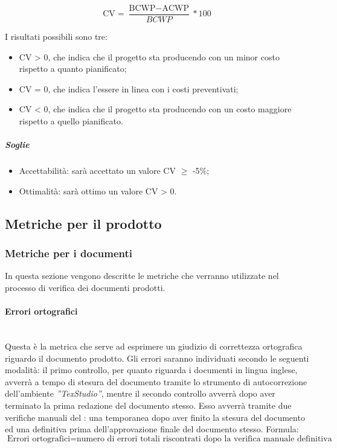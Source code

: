 	\begin{displaymath}
\mbox{CV}= \frac{\mbox{BCWP}-\mbox{ACWP}}{BCWP}*100\end{displaymath}

I risultati possibili sono tre:

\begin{itemize}
\item CV > 0, che indica che il progetto sta producendo con un minor costo rispetto a quanto pianificato;
\item CV = 0, che indica l'essere in linea con i costi preventivati;
\item CV < 0, che indica che il progetto sta producendo con un costo maggiore rispetto a quello pianificato.
\end{itemize}

\subparagraph{Soglie}
\begin{itemize}
\item Accettabilità: sarà accettato un valore CV $\ge$ -5\%;
\item Ottimalità: sarà ottimo un valore CV > 0.
\end{itemize}

\subsection{Metriche per il prodotto}
\label{AppB:metricheProd}
\subsubsection{Metriche per i documenti}
\label{AppB:metricheDoc}
In questa sezione vengono descritte le metriche che verranno utilizzate nel processo di verifica dei documenti prodotti.
\paragraph{Errori ortografici}
\label{AppB:ErroriOrtografici}
	~\\Questa è la metrica che serve ad esprimere un giudizio di correttezza ortografica riguardo il documento prodotto. Gli errori saranno individuati secondo le seguenti modalità:
il primo controllo, per quanto riguarda i documenti in lingua inglese, avverrà a tempo di stesura del documento tramite lo strumento di autocorrezione dell'ambiente \emph{''TexStudio''}, mentre il secondo controllo avverrà dopo aver terminato la prima redazione del documento stesso. Esso avverrà tramite due verifiche manuali del \ver{}: una temporanea dopo aver finito la stesura del documento ed una definitiva prima dell'approvazione finale del documento stesso.
\newline Formula:
\begin{displaymath}
\mbox{Errori ortografici}= {\mbox{numero di errori totali riscontrati dopo la verifica manuale definitiva}}
\end{displaymath}

